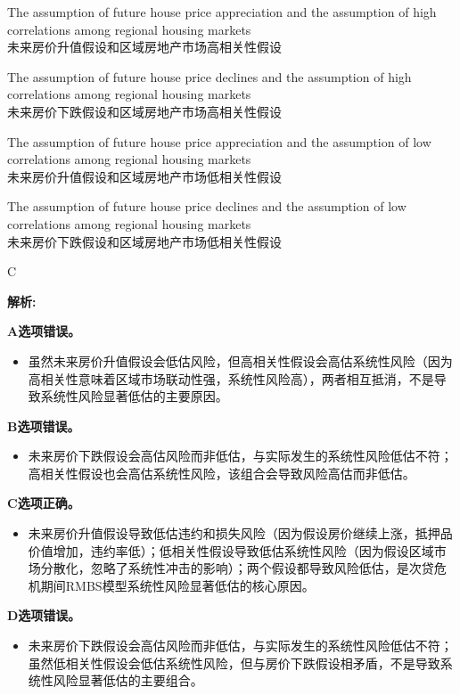 \documentclass{article}
\newenvironment{explanation}
{\textbf{解析:}\par}
{\par}
\begin{document}
\begin{choices}
    \item The assumption of future house price appreciation and the assumption of high correlations among regional housing markets\\
    未来房价升值假设和区域房地产市场高相关性假设
    \item The assumption of future house price declines and the assumption of high correlations among regional housing markets\\
    未来房价下跌假设和区域房地产市场高相关性假设
    \item The assumption of future house price appreciation and the assumption of low correlations among regional housing markets\\
    未来房价升值假设和区域房地产市场低相关性假设
    \item The assumption of future house price declines and the assumption of low correlations among regional housing markets\\
    未来房价下跌假设和区域房地产市场低相关性假设
\end{choices}

\begin{correctanswer}
    C
\end{correctanswer}

\begin{explanation}
    \textbf{A选项错误。}
    \begin{itemize}
        \item 虽然未来房价升值假设会低估风险，但高相关性假设会高估系统性风险（因为高相关性意味着区域市场联动性强，系统性风险高），两者相互抵消，不是导致系统性风险显著低估的主要原因。
    \end{itemize}

    \textbf{B选项错误。}
    \begin{itemize}
        \item 未来房价下跌假设会高估风险而非低估，与实际发生的系统性风险低估不符；高相关性假设也会高估系统性风险，该组合会导致风险高估而非低估。
    \end{itemize}

    \textbf{C选项正确。}
    \begin{itemize}
        \item 未来房价升值假设导致低估违约和损失风险（因为假设房价继续上涨，抵押品价值增加，违约率低）；低相关性假设导致低估系统性风险（因为假设区域市场分散化，忽略了系统性冲击的影响）；两个假设都导致风险低估，是次贷危机期间RMBS模型系统性风险显著低估的核心原因。
    \end{itemize}

    \textbf{D选项错误。}
    \begin{itemize}
        \item 未来房价下跌假设会高估风险而非低估，与实际发生的系统性风险低估不符；虽然低相关性假设会低估系统性风险，但与房价下跌假设相矛盾，不是导致系统性风险显著低估的主要组合。
    \end{itemize}
\end{explanation}
\end{document}
